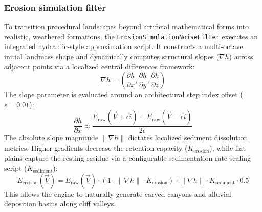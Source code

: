 \documentclass[12pt]{report}
\begin{document}
\subsubsection{Erosion simulation filter}
To transition procedural landscapes beyond artificial mathematical forms into realistic, weathered formations, the \texttt{ErosionSimulationNoiseFilter} executes an integrated hydraulic-style approximation script. It constructs a multi-octave initial landmass shape and dynamically computes structural slopes ($\nabla h$) across adjacent points via a localized central differences framework:
\begin{equation}
\nabla h = \left( \frac{\partial h}{\partial x}, \frac{\partial h}{\partial y}, \frac{\partial h}{\partial z} \right)
\end{equation}
The slope parameter is evaluated around an architectural step index offset ($\epsilon = 0.01$):
\begin{equation}
\frac{\partial h}{\partial x} \approx \frac{E_{\text{raw}}(\vec{V} + \epsilon\hat{i}) - E_{\text{raw}}(\vec{V} - \epsilon\hat{i})}{2\epsilon}
\end{equation}
The absolute slope magnitude $\|\nabla h\|$ dictates localized sediment dissolution metrics. Higher gradients decrease the retention capacity ($K_{\text{erosion}}$), while flat plains capture the resting residue via a configurable sedimentation rate scaling script ($K_{\text{sediment}}$):
\begin{equation}
E_{\text{erosion}}(\vec{V}) = E_{\text{raw}}(\vec{V}) \cdot (1 - \|\nabla h\| \cdot K_{\text{erosion}}) + \|\nabla h\| \cdot K_{\text{sediment}} \cdot 0.5
\end{equation}
This allows the engine to naturally generate carved canyons and alluvial deposition basins along cliff valleys.
\end{document}
